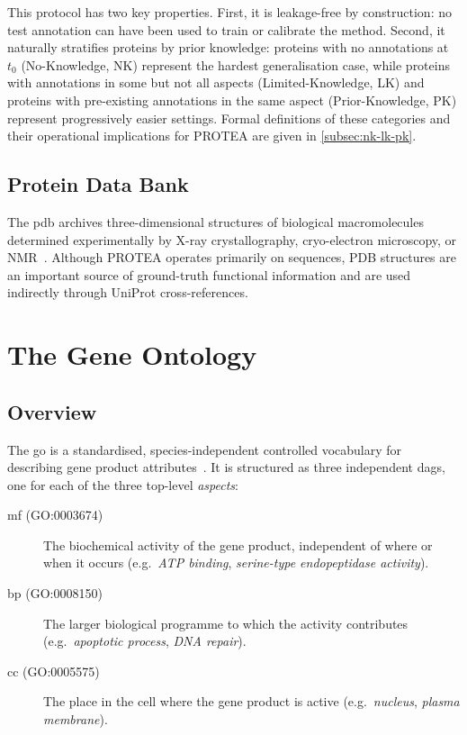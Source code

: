 This protocol has two key properties. First, it is leakage-free by
construction: no test annotation can have been used to train or calibrate the
method. Second, it naturally stratifies proteins by prior knowledge: proteins
with no annotations at $t_0$ (No-Knowledge, NK) represent the hardest
generalisation case, while proteins with annotations in some but not all
aspects (Limited-Knowledge, LK) and proteins with pre-existing annotations in
the same aspect (Prior-Knowledge, PK) represent progressively easier settings.
Formal definitions of these categories and their operational implications for
PROTEA are given in \cref{subsec:nk-lk-pk}.

\subsection{Protein Data Bank}
\label{subsec:pdb}

The \gls{pdb} archives three-dimensional structures of biological macromolecules
determined experimentally by X-ray crystallography, cryo-electron microscopy, or
NMR~\cite{berman2000pdb}. Although PROTEA operates primarily on sequences, PDB
structures are an important source of ground-truth functional information and are
used indirectly through UniProt cross-references.

\section{The Gene Ontology}
\label{sec:gene-ontology}

\subsection{Overview}
\label{subsec:go-overview}

The \gls{go} is a standardised, species-independent controlled vocabulary for
describing gene product attributes~\cite{ashburner2000go,goconsortium2023}.
It is structured as three independent \glspl{dag}, one for each of the three
top-level \textit{aspects}:

\begin{description}
  \item[\gls{mf} (GO:0003674)] The biochemical activity of the gene product,
    independent of where or when it occurs (e.g.\ \textit{ATP binding},
    \textit{serine-type endopeptidase activity}).
  \item[\gls{bp} (GO:0008150)] The larger biological programme to which the
    activity contributes (e.g.\ \textit{apoptotic process},
    \textit{DNA repair}).
  \item[\gls{cc} (GO:0005575)] The place in the cell where the gene product
    is active (e.g.\ \textit{nucleus}, \textit{plasma membrane}).
\end{description}

